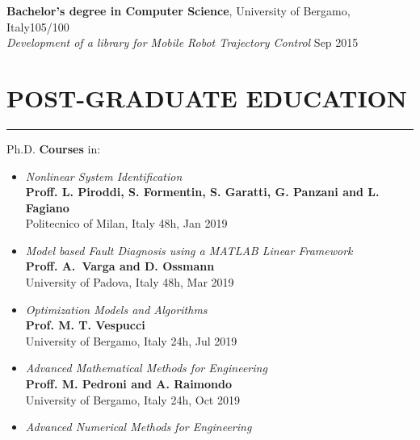 \documentclass[10pt]{article}
\newcommand{\cvsection}[1]{\section*{\centering\normalsize\uppercase{#1}}\vspace{-16pt}\rule{\linewidth}{0.2pt}\vspace{6pt}}
\begin{document}
\textbf{Bachelor's degree in Computer Science}, University of Bergamo, Italy\hfill 105\slash100 \\
\textit{Development of a library for Mobile Robot Trajectory Control} \hfill Sep 2015

\clearpage


\cvsection{post-graduate education}
Ph.D. \textbf{Courses} in:
\begin{itemize}	
	\setlength\itemsep{-12pt}
	\renewcommand\labelitemi{$\vcenter{\hbox{\tiny$\bullet$}}$}
	\item \textit{Nonlinear System Identification} \\
	\textbf{Proff. L. Piroddi, S. Formentin, S. Garatti, G. Panzani and L. Fagiano}\\
	Politecnico of Milan, Italy \hfill 48h, Jan 2019 \\
	\item \textit{Model based Fault Diagnosis using a MATLAB Linear Framework}\\
	\textbf{Proff. A. Varga and D. Ossmann}\\
	University of Padova, Italy \hfill 48h, Mar 2019\\
	\item \textit{Optimization Models and Algorithms} \\
	\textbf{Prof. M. T. Vespucci}\\
	University of Bergamo, Italy \hfill 24h, Jul 2019\\
	\item \textit{Advanced Mathematical Methods for Engineering}\\
	\textbf{Proff. M. Pedroni and A. Raimondo}\\
	University of Bergamo, Italy \hfill 24h, Oct 2019\\
	\item \textit{Advanced Numerical Methods for Engineering}\\

\end{itemize}
\end{document}
